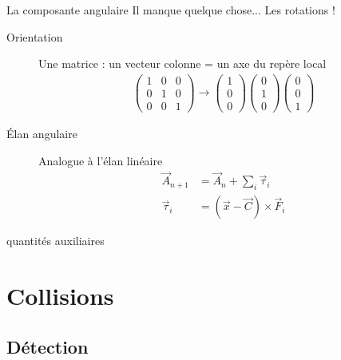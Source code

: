 \documentclass{beamer}
\begin{document}
\begin{frame}{La composante angulaire}
  Il manque quelque chose... Les rotations !

  \begin{description}
    \item[Orientation]
      Une matrice : un vecteur colonne = un axe du repère local
      \begin{align*}
        \begin{pmatrix}
          1 & 0 & 0 \\ 0 & 1 & 0 \\ 0 & 0 & 1
        \end{pmatrix}
        \rightarrow
        \begin{pmatrix}
          1 \\ 0 \\ 0
        \end{pmatrix}
        \begin{pmatrix}
          0 \\ 1 \\ 0
        \end{pmatrix}
        \begin{pmatrix}
          0 \\ 0 \\ 1
        \end{pmatrix}
      \end{align*}
      
    \item[\'Elan angulaire]
      Analogue à l'élan linéaire
      \begin{align*}
        \vec{A}_{n+1} &= \vec{A}_n + {\sum_i \vec{\tau}_i} \\
        \vec{\tau}_i &= (\vec{x} - \vec{C}) \times \vec{F}_i
      \end{align*}
  \end{description}
\end{frame}

\begin{frame}
  quantités auxiliaires
\end{frame}

\section{Collisions}

\subsection{Détection}
\end{document}
